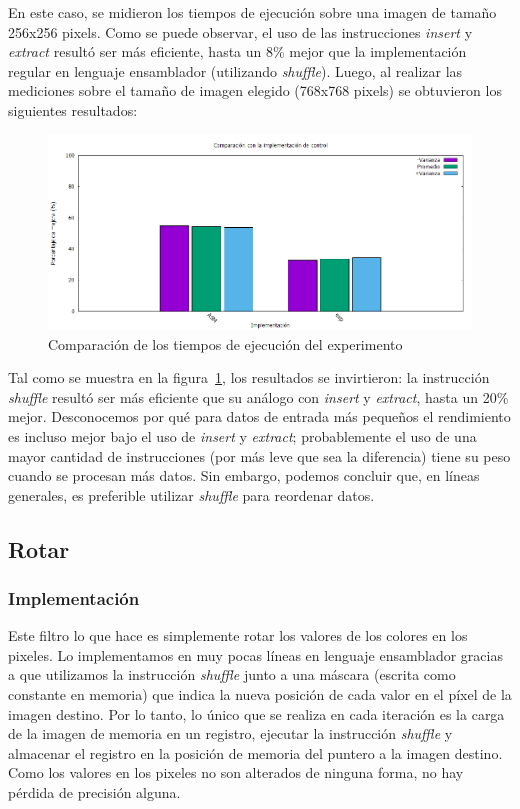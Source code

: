 \documentclass[a4paper]{article}
\begin{document}
En este caso, se midieron los tiempos de ejecución sobre una imagen de tamaño 256x256 pixels. Como se puede observar, el uso de las instrucciones \textit{insert} y \textit{extract} resultó ser más eficiente, hasta un 8\% mejor que la implementación regular en lenguaje ensamblador (utilizando \textit{shuffle}). Luego, al realizar las mediciones sobre el tamaño de imagen elegido (768x768 pixels) se obtuvieron los siguientes resultados:
\\
\begin{figure}[H]
  \begin{center}
	\includegraphics[scale=0.66]{imagenes/smalltilesExp.png}
	\caption{Comparación de los tiempos de ejecución del experimento}
	\label{smalltiles_exp}
  \end{center}
\end{figure}

Tal como se muestra en la figura~\ref{smalltiles_exp}, los resultados se invirtieron: la instrucción \textit{shuffle} resultó ser más eficiente que su análogo con \textit{insert} y \textit{extract}, hasta un 20\% mejor. Desconocemos por qué para datos de entrada más pequeños el rendimiento es incluso mejor bajo el uso de \textit{insert} y \textit{extract}; probablemente el uso de una mayor cantidad de instrucciones (por más leve que sea la diferencia) tiene su peso cuando se procesan más datos. Sin embargo, podemos concluir que, en líneas generales, es preferible utilizar \textit{shuffle} para reordenar datos.

\newpage
\subsection{Rotar}
\subsubsection{Implementación}
Este filtro lo que hace es simplemente rotar los valores de los colores en los pixeles. Lo implementamos en muy pocas líneas en lenguaje ensamblador gracias a que utilizamos la instrucción \textit{shuffle} junto a una máscara (escrita como constante en memoria) que indica la nueva posición de cada valor en el píxel de la imagen destino. Por lo tanto, lo único que se realiza en cada iteración es la carga de la imagen de memoria en un registro, ejecutar la instrucción \textit{shuffle} y almacenar el registro en la posición de memoria del puntero a la imagen destino. 
\\Como los valores en los pixeles no son alterados de ninguna forma, no hay pérdida de precisión alguna.\\
\end{document}
